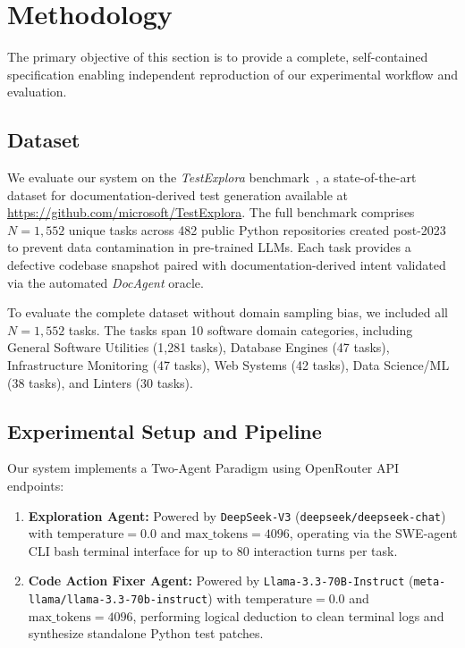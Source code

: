\section{Methodology}
\label{sec:method}

The primary objective of this section is to provide a complete, self-contained specification enabling independent reproduction of our experimental workflow and evaluation.

\subsection{Dataset}
\label{subsec:dataset}
We evaluate our system on the \textit{TestExplora} benchmark~\cite{testexplora}, a state-of-the-art dataset for documentation-derived test generation available at \url{https://github.com/microsoft/TestExplora}. The full benchmark comprises $N=1,552$ unique tasks across 482 public Python repositories created post-2023 to prevent data contamination in pre-trained LLMs. Each task provides a defective codebase snapshot paired with documentation-derived intent validated via the automated \textit{DocAgent} oracle. 

To evaluate the complete dataset without domain sampling bias, we included all $N=1,552$ tasks. The tasks span 10 software domain categories, including General Software Utilities (1,281 tasks), Database Engines (47 tasks), Infrastructure Monitoring (47 tasks), Web Systems (42 tasks), Data Science/ML (38 tasks), and Linters (30 tasks).

\subsection{Experimental Setup and Pipeline}
\label{subsec:setup}
Our system implements a Two-Agent Paradigm using OpenRouter API endpoints:
\begin{enumerate}
    \item \textbf{Exploration Agent:} Powered by \texttt{DeepSeek-V3} (\texttt{deepseek/deepseek-chat}) with $\text{temperature}=0.0$ and $\text{max\_tokens}=4096$, operating via the SWE-agent CLI bash terminal interface for up to 80 interaction turns per task.
    \item \textbf{Code Action Fixer Agent:} Powered by \texttt{Llama-3.3-70B-Instruct} (\texttt{meta-llama/llama-3.3-70b-instruct}) with $\text{temperature}=0.0$ and $\text{max\_tokens}=4096$, performing logical deduction to clean terminal logs and synthesize standalone Python test patches.
\end{enumerate}

